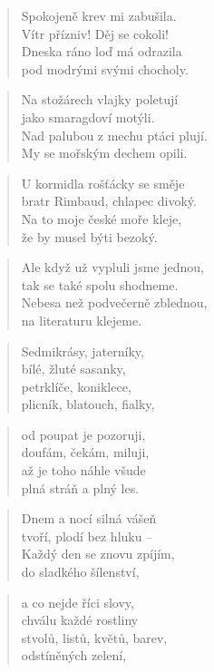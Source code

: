 \documentclass{book}
\begin{document}
\begin{verse}
Spokojeně krev mi zabušila.\\
Vítr přízniv! Děj se cokoli!\\
Dneska ráno loď má odrazila\\
pod modrými svými chocholy.
\end{verse}
\begin{verse}
Na stožárech vlajky poletují\\
jako smaragdoví motýli.\\
Nad palubou z mechu ptáci plují.\\
My se mořským dechem opili.
\end{verse}
\begin{verse}
U kormidla rošťácky se směje\\
bratr Rimbaud, chlapec divoký.\\
Na to moje české moře kleje,\\
že by musel býti bezoký.
\end{verse}
\begin{verse}
Ale když už vypluli jsme jednou,\\
tak se také spolu shodneme.\\
Nebesa než podvečerně zblednou,\\
na literaturu klejeme.
\end{verse}
\newpage
{}
\begin{verse}
Sedmikrásy, jaterníky,\\
bílé, žluté sasanky,\\
petrklíče, koniklece,\\
plicník, blatouch, fialky,
\end{verse}
\begin{verse}
od poupat je pozoruji,\\
doufám, čekám, miluji,\\
až je toho náhle všude\\
plná stráň a plný les.
\end{verse}
\begin{verse}
Dnem a nocí silná vášeň\\
tvoří, plodí bez hluku --\\
Každý den se znovu zpíjím,\\
do sladkého šílenství,
\end{verse}
\begin{verse}
a co nejde říci slovy,\\
chválu každé rostliny\\
stvolů, listů, květů, barev,\\
odstíněných zelení,
\end{verse}
\end{document}
